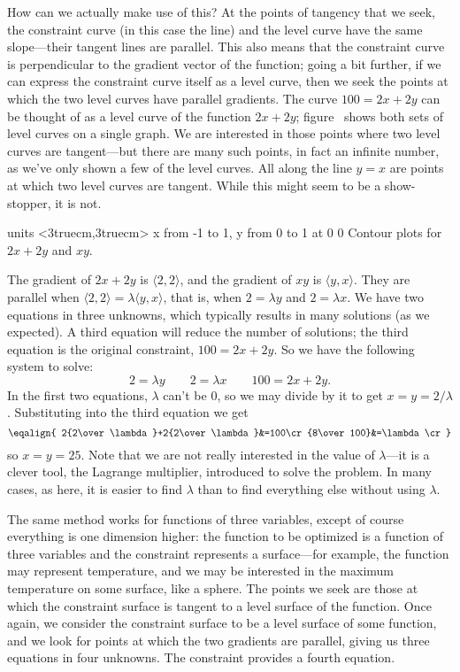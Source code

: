 How can we actually make use of this? At the points of tangency that
we seek, the constraint curve (in this case the line) and the level
curve have the same slope---their tangent lines are parallel. This also
means that the constraint curve is perpendicular to the gradient
vector of the function; going a bit further, if we can express the
constraint curve itself as a level curve, then we seek the points at
which the two level curves have parallel gradients.
The curve $100=2x+2y$ can be thought of as a level curve of the
function $2x+2y$; figure~ shows both sets of
level curves on a single graph. We are interested in those points
where two level curves are tangent---but there are many such points,
in fact an infinite number, as we've only shown a few of the level
curves. All along the line $y=x$ are points at which two level curves
are tangent. While this might seem to be a show-stopper, it is
not. 

\figure
\texonly
\vbox{\beginpicture
\normalgraphs
\ninepoint
\setcoordinatesystem units <3truecm,3truecm>
\setplotarea x from -1 to 1, y from 0 to 1
 at 0 0
\endpicture}
\endtexonly
{}
\begincaption
Contour plots for $2x+2y$ and $xy$.
\endcaption
\endfigure

The gradient of $2x+2y$ is $\langle 2,2\rangle$, and the gradient of
$xy$ is $\langle y,x\rangle$. They are parallel when
$\langle 2,2\rangle=\lambda\langle y,x\rangle$, that is, when
$2=\lambda y$ and $2=\lambda x$. We have two equations in three
unknowns, which typically results in many solutions (as we
expected). A third equation will reduce the number of solutions; the
third equation is the original constraint, $100=2x+2y$. So we have the
following system to solve:
$$2=\lambda y \qquad 2=\lambda x\qquad 100=2x+2y.$$
In the first two equations, $\lambda$ can't be 0, so we may divide by
it to get $x=y=2/\lambda$. Substituting into the third equation we get 
$$\eqalign{
2{2\over \lambda}+2{2\over \lambda}&=100\cr
{8\over100}&=\lambda\cr
}$$
so $x=y=25$. Note that we are not really interested in the value of
$\lambda$---it is a clever tool, the Lagrange multiplier, introduced
to solve the problem. In many cases, as here, it is easier to find
$\lambda$ than to find everything else without using $\lambda$.

The same method works for functions of three variables, except of
course everything is one dimension higher: the function to be
optimized is a function of three variables and the constraint represents
a surface---for example, the function may represent temperature, and
we may be interested in the maximum temperature on some surface, like
a sphere.
The points we seek are those at which the constraint
surface is tangent to a level surface of the function. Once again, we
consider the constraint surface to be a level surface of some
function, and we look for points at which the two gradients are
parallel, giving us three equations in four unknowns. The constraint
provides a fourth equation.

